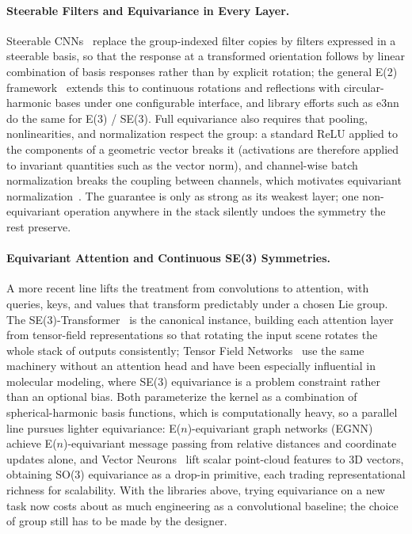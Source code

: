 \paragraph{Steerable Filters and Equivariance in Every Layer.}
Steerable CNNs~\cite{cohen2017steerable} replace the group-indexed filter copies by filters expressed in a steerable basis, so that the response at a transformed orientation follows by linear combination of basis responses rather than by explicit rotation; the general E(2) framework~\cite{weiler2019general} extends this to continuous rotations and reflections with circular-harmonic bases under one configurable interface, and library efforts such as e3nn~\cite{geiger2022e3nn} do the same for E(3) / SE(3).
Full equivariance also requires that pooling, nonlinearities, and normalization respect the group: a standard ReLU applied to the components of a geometric vector breaks it (activations are therefore applied to invariant quantities such as the vector norm), and channel-wise batch normalization breaks the coupling between channels, which motivates equivariant normalization~\cite{meng2024geometric}.
The guarantee is only as strong as its weakest layer; one non-equivariant operation anywhere in the stack silently undoes the symmetry the rest preserve.

\paragraph{Equivariant Attention and Continuous SE(3) Symmetries.}
A more recent line lifts the treatment from convolutions to attention, with queries, keys, and values that transform predictably under a chosen Lie group.
The SE(3)-Transformer~\cite{fuchs2020se} is the canonical instance, building each attention layer from tensor-field representations so that rotating the input scene rotates the whole stack of outputs consistently; Tensor Field Networks~\cite{thomas2018tensorfield} use the same machinery without an attention head and have been especially influential in molecular modeling, where SE(3) equivariance is a problem constraint rather than an optional bias.
Both parameterize the kernel as a combination of spherical-harmonic basis functions, which is computationally heavy, so a parallel line pursues lighter equivariance: E($n$)-equivariant graph networks (EGNN)~\cite{satorras2021egnn} achieve E($n$)-equivariant message passing from relative distances and coordinate updates alone, and Vector Neurons~\cite{deng2021vector} lift scalar point-cloud features to 3D vectors, obtaining SO(3) equivariance as a drop-in primitive, each trading representational richness for scalability.
With the libraries above, trying equivariance on a new task now costs about as much engineering as a convolutional baseline; the choice of group still has to be made by the designer.


